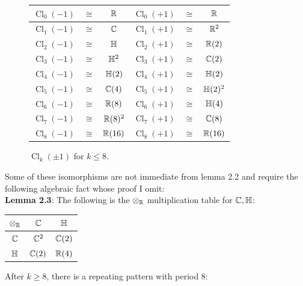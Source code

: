 \documentclass{amsart}
\DeclareMathOperator{\Cl}{\mathrm{Cl}}
\begin{document}
	\begin{figure}[h]
	\begin{center}
	{\tabulinesep=1mm
	\begin{tabu}{|ccc||ccc|}
		\hline
		$\Cl_0(-1)$ & $\cong$ & $\mathbb{R}$ & $\Cl_0(+1)$ & $\cong$ & $\mathbb{R}$\\
		\hline
		$\Cl_1(-1)$ &$\cong$ & $\mathbb{C}$ & $\Cl_1(+1)$ &$\cong$ & $\mathbb{R}^2$\\
		\hline
		$\Cl_2(-1)$ &$\cong$ & $\mathbb{H}$ & $\Cl_2(+1)$ &$\cong$ & $\mathbb{R}(2)$\\
		\hline 
		$\Cl_3(-1)$ &$\cong$ & $\mathbb{H}^2$ & $\Cl_3(+1)$ &$\cong$ & $\mathbb{C}(2)$\\
		\hline 
		$\Cl_4(-1)$ &$\cong$ & $\mathbb{H}(2)$ & $\Cl_4(+1)$ &$\cong$ & $\mathbb{H}(2)$\\
		\hline 
		$\Cl_5(-1)$ &$\cong$ & $\mathbb{C}(4)$ & $\Cl_5(+1)$ &$\cong$ & $\mathbb{H}(2)^2$\\
		\hline 
		$\Cl_6(-1)$ &$\cong$ & $\mathbb{R}(8)$ & $\Cl_6(+1)$ &$\cong$ & $\mathbb{H}(4)$\\
		\hline 
		$\Cl_7(-1)$ &$\cong$ & $\mathbb{R}(8)^2$ & $\Cl_7(+1)$ &$\cong$ & $\mathbb{C}(8)$\\
		\hline 
		$\Cl_8(-1)$ &$\cong$ & $\mathbb{R}(16)$ & $\Cl_8(+1)$ &$\cong$ & $\mathbb{R}(16)$\\
		\hline
	\end{tabu}}
	\end{center}
	\caption{$\Cl_k(\pm 1)$ for $k\leq 8$.}
\end{figure}

Some of these isomorphisms are not immediate from lemma 2.2 and require the following algebraic fact whose proof I omit:\\

\noindent \textbf{Lemma 2.3}: The following is the $\otimes_{\mathbb{R}}$ multiplication table for $\mathbb{C},\mathbb{H}$:
\begin{center}
	{\tabulinesep=0.6mm
\begin{tabu}{|c|c|c|}
	\hline 
	$\otimes_{\mathbb{R}}$ & $\mathbb{C}$ & $\mathbb{H}$\\
	\hline
	$\mathbb{C}$ & $\mathbb{C}^2$ & $\mathbb{C}(2)$\\
	\hline
	$\mathbb{H}$ & $\mathbb{C}(2)$ &$\mathbb{R}(4)$\\
	\hline 
\end{tabu}}
\end{center}
\newpage

After $k\geq 8$, there is a repeating pattern with period 8:\\
\end{document}
